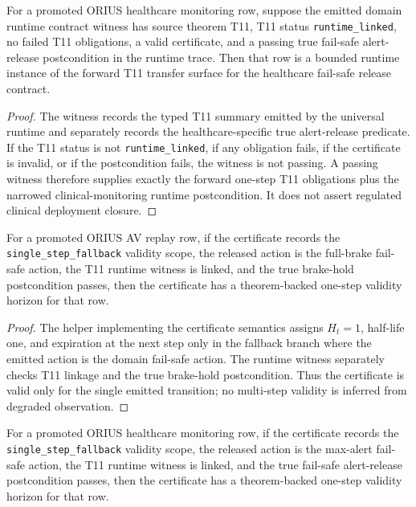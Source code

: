 \begin{lemma}
For a promoted ORIUS healthcare monitoring row, suppose the emitted domain
runtime contract witness has source theorem T11, T11 status
\texttt{runtime\_linked}, no failed T11 obligations, a valid certificate,
and a passing true fail-safe alert-release postcondition in the runtime
trace.  Then that row is a bounded runtime instance of the forward T11
transfer surface for the healthcare fail-safe release contract.
\end{lemma}

\begin{proof}
The witness records the typed T11 summary emitted by the universal runtime
and separately records the healthcare-specific true alert-release predicate.
If the T11 status is not \texttt{runtime\_linked}, if any obligation fails,
if the certificate is invalid, or if the postcondition fails, the witness is
not passing.  A passing witness therefore supplies exactly the forward
one-step T11 obligations plus the narrowed clinical-monitoring runtime
postcondition.  It does not assert regulated clinical deployment closure.
\end{proof}

\begin{lemma}
For a promoted ORIUS AV replay row, if the certificate records the
\texttt{single\_step\_fallback} validity scope, the released action is the
full-brake fail-safe action, the T11 runtime witness is linked, and the true
brake-hold postcondition passes, then the certificate has a theorem-backed
one-step validity horizon for that row.
\end{lemma}

\begin{proof}
The helper implementing the certificate semantics assigns
$H_t=1$, half-life one, and expiration at the next step only in the fallback
branch where the emitted action is the domain fail-safe action.  The runtime
witness separately checks T11 linkage and the true brake-hold postcondition.
Thus the certificate is valid only for the single emitted transition; no
multi-step validity is inferred from degraded observation.
\end{proof}

\begin{lemma}
For a promoted ORIUS healthcare monitoring row, if the certificate records
the \texttt{single\_step\_fallback} validity scope, the released action is the
max-alert fail-safe action, the T11 runtime witness is linked, and the true
fail-safe alert-release postcondition passes, then the certificate has a
theorem-backed one-step validity horizon for that row.
\end{lemma}

